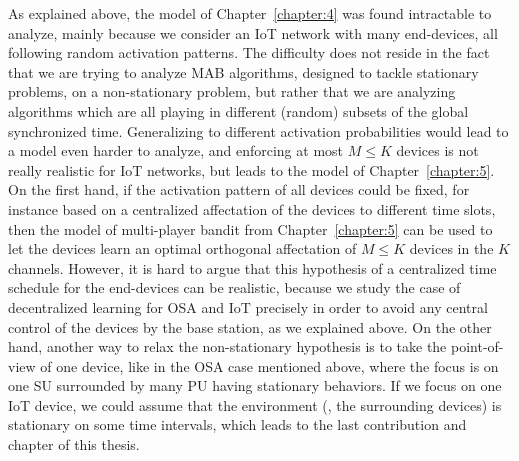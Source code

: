As explained above, the model of Chapter~\ref{chapter:4} was found intractable to analyze, mainly because we consider an IoT network with many end-devices, all following random activation patterns.
The difficulty does not reside in the fact that we are trying to analyze MAB algorithms, designed to tackle stationary problems, on a non-stationary problem,
but rather that we are analyzing algorithms which are all playing in different (random) subsets of the global synchronized time.
Generalizing to different activation probabilities would lead to a model even harder to analyze, and enforcing at most $M \leq K$ devices is not really realistic for IoT networks, but leads to the model of Chapter~\ref{chapter:5}.\\
%
\indent
On the first hand, if the activation pattern of all devices could be fixed, for instance based on a centralized affectation of the devices to different time slots, then the model of multi-player bandit from Chapter~\ref{chapter:5} can be used to let the devices learn an optimal orthogonal affectation of $M \leq K$ devices in the $K$ channels.
However, it is hard to argue that this hypothesis of a centralized time schedule for the end-devices can be realistic, because we study the case of decentralized learning for OSA and IoT precisely in order to avoid any central control of the devices by the base station, as we explained above.
%
On the other hand, another way to relax the non-stationary hypothesis is to take the point-of-view of one device, like in the OSA case mentioned above, where the focus is on one SU surrounded by many PU having stationary behaviors.
If we focus on one IoT device, we could assume that the environment (\ie, the surrounding devices) is stationary on some time intervals, which leads to the last contribution and chapter of this thesis.


